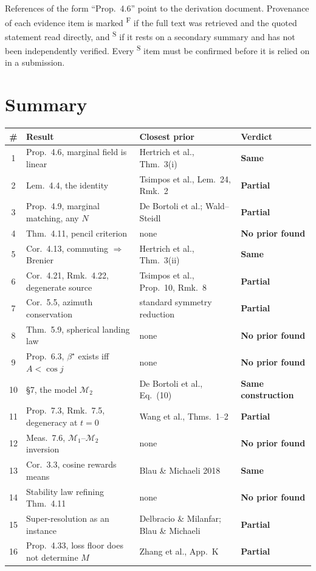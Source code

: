 \documentclass[11pt]{article}
\newcommand{\F}{\textsuperscript{F}}
\newcommand{\Sec}{\textsuperscript{S}}
\begin{document}
References of the form ``Prop.~4.6'' point to the derivation document. Provenance of each
evidence item is marked \F{} if the full text was retrieved and the quoted statement read
directly, and \Sec{} if it rests on a secondary summary and has not been independently verified.
Every \Sec{} item must be confirmed before it is relied on in a submission.

\section{Summary}

\begin{longtable}{@{}clll@{}}
\toprule
\# & Result & Closest prior & Verdict\\
\midrule
\endhead
1 & Prop.~4.6, marginal field is linear & Hertrich et al., Thm.~3(i) & \textbf{Same}\\
2 & Lem.~4.4, the identity & Tsimpos et al., Lem.~24, Rmk.~2 & \textbf{Partial}\\
3 & Prop.~4.9, marginal matching, any $N$ & De Bortoli et al.; Wald--Steidl & \textbf{Partial}\\
4 & Thm.~4.11, pencil criterion & none & \textbf{No prior found}\\
5 & Cor.~4.13, commuting $\Rightarrow$ Brenier & Hertrich et al., Thm.~3(ii) & \textbf{Same}\\
6 & Cor.~4.21, Rmk.~4.22, degenerate source & Tsimpos et al., Prop.~10, Rmk.~8 & \textbf{Partial}\\
7 & Cor.~5.5, azimuth conservation & standard symmetry reduction & \textbf{Partial}\\
8 & Thm.~5.9, spherical landing law & none & \textbf{No prior found}\\
9 & Prop.~6.3, $\beta^\star$ exists iff $A<\cos j$ & none & \textbf{No prior found}\\
10 & \S7, the model $\mathcal M_2$ & De Bortoli et al., Eq.~(10) & \textbf{Same construction}\\
11 & Prop.~7.3, Rmk.~7.5, degeneracy at $t=0$ & Wang et al., Thms.~1--2 & \textbf{Partial}\\
12 & Meas.~7.6, $\mathcal M_1$--$\mathcal M_2$ inversion & none & \textbf{No prior found}\\
13 & Cor.~3.3, cosine rewards means & Blau \& Michaeli 2018 & \textbf{Same}\\
14 & Stability law refining Thm.~4.11 & none & \textbf{No prior found}\\
15 & Super-resolution as an instance & Delbracio \& Milanfar; Blau \& Michaeli & \textbf{Partial}\\
16 & Prop.~4.33, loss floor does not determine $M$ & Zhang et al., App.~K & \textbf{Partial}\\
\bottomrule
\end{longtable}
\end{document}
